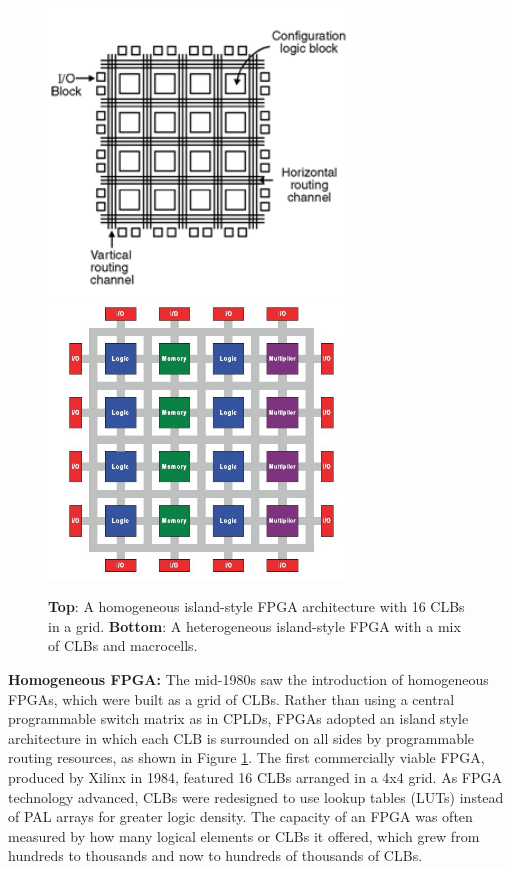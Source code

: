 \documentclass[twocolumn]{article}
\begin{document}
    \begin{figure}
        \centering
        \includegraphics[width=8.0cm]{figures/homogenous_fpga.png}
        \includegraphics[width=8.0cm]{figures/heterogenous_fpga_3.jpg}
        \caption{
            \textbf{Top}: A homogeneous island-style FPGA architecture with 16 CLBs in a grid. 
            \textbf{Bottom}: A heterogeneous island-style FPGA with a mix of CLBs and macrocells.
        }
        \label{fig:fpga}
    \end{figure}

    \textbf{Homogeneous FPGA:} \quad 
    The mid-1980s saw the introduction of homogeneous FPGAs, which were built as a grid of CLBs. 
    Rather than using a central programmable switch matrix as in CPLDs, FPGAs adopted an island style architecture in which each CLB is surrounded on all sides by programmable routing resources, as shown in Figure \ref{fig:fpga}. 
    The first commercially viable FPGA, produced by Xilinx in 1984, featured 16 CLBs arranged in a 4x4 grid. 
    As FPGA technology advanced, CLBs were redesigned to use lookup tables (LUTs) instead of PAL arrays for greater logic density. 
    The capacity of an FPGA was often measured by how many logical elements or CLBs it offered, which grew from hundreds to thousands and now to hundreds of thousands of CLBs.
\end{document}
